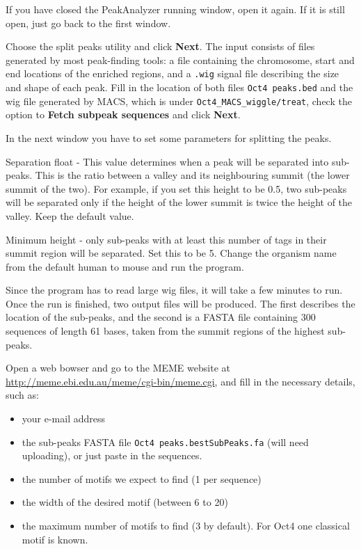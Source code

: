 \begin{steps}
If you have closed the PeakAnalyzer running window, open it again. If it is
still open, just go back to the first window.

Choose the split peaks utility and click \textbf{Next}. The input consists of
files generated by most peak-finding tools: a file containing the chromosome,
start and end locations of the enriched regions, and a \texttt{.wig} signal file
describing the size and shape of each peak. Fill in the location of both files
\texttt{Oct4 peaks.bed} and the wig file generated by MACS, which is under
\texttt{Oct4\_MACS\_wiggle/treat}, check the option to \textbf{Fetch subpeak
sequences} and click \textbf{Next}.

In the next window you have to set some parameters for splitting the peaks.

Separation float - This value determines when a peak will be separated into
sub-peaks. This is the ratio between a valley and its neighbouring summit (the
lower summit of the two). For example, if you set this height to be 0.5, two
sub-peaks will be separated only if the height of the lower summit is twice the
height of the valley. Keep the default value.

Minimum height - only sub-peaks with at least this number of tags in their
summit region will be separated. Set this to be 5. Change the organism name from
the default human to mouse and run the program.
\end{steps}

\begin{information}
Since the program has to read large wig files, it will take a few minutes to
run. Once the run is finished, two output files will be produced. The first
describes the location of the sub-peaks, and the second is a FASTA file
containing 300 sequences of length 61 bases, taken from the summit regions of
the highest sub-peaks.
\end{information}

\begin{steps}
Open a web bowser and go to the MEME website at
\url{http://meme.ebi.edu.au/meme/cgi-bin/meme.cgi}, and fill in the necessary
details, such as:
\begin{itemize}
	\item your e-mail address 
	\item the sub-peaks FASTA file \texttt{Oct4 peaks.bestSubPeaks.fa} (will need uploading), or just paste in the sequences. 
	\item the number of motifs we expect to find (1 per sequence) 
	\item the width of the desired motif (between 6 to 20) 
	\item the maximum number of motifs to find (3 by default). For Oct4 one classical motif is known. 
\end{itemize}
\end{steps}

